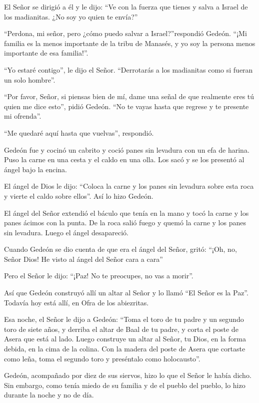  El Señor se dirigió a él y le dijo: ``Ve con la fuerza que
tienes y salva a Israel de los madianitas. ¿No soy yo quien te envía?''

 ``Perdona, mi señor, pero ¿cómo puedo salvar a
Israel?''respondió Gedeón. ``¡Mi familia es la menos importante de la
tribu de Manasés, y yo soy la persona menos importante de esa
familia!''.

 ``Yo estaré contigo'', le dijo el Señor. ``Derrotarás a
los madianitas como si fueran un solo hombre''.

 ``Por favor, Señor, si piensas bien de mí, dame una señal
de que realmente eres tú quien me dice esto'', pidió Gedeón.
 ``No te vayas hasta que regrese y te presente mi
ofrenda''.

``Me quedaré aquí hasta que vuelvas'', respondió.

 Gedeón fue y cocinó un cabrito y coció panes sin levadura
con un efa de harina. Puso la carne en una cesta y el caldo en una olla.
Los sacó y se los presentó al ángel bajo la encina.

 El ángel de Dios le dijo: ``Coloca la carne y los panes
sin levadura sobre esta roca y vierte el caldo sobre ellos''. Así lo
hizo Gedeón.

 El ángel del Señor extendió el báculo que tenía en la mano
y tocó la carne y los panes ácimos con la punta. De la roca salió fuego
y quemó la carne y los panes sin levadura. Luego el ángel desapareció.

 Cuando Gedeón se dio cuenta de que era el ángel del Señor,
gritó: ``¡Oh, no, Señor Dios! He visto al ángel del Señor cara a cara''

 Pero el Señor le dijo: ``¡Paz! No te preocupes, no vas a
morir''.

 Así que Gedeón construyó allí un altar al Señor y lo llamó
``El Señor es la Paz''. Todavía hoy está allí, en Ofra de los
abiezritas.

 Esa noche, el Señor le dijo a Gedeón: ``Toma el toro de tu
padre y un segundo toro de siete años, y derriba el altar de Baal de tu
padre, y corta el poste de Asera que está al lado.  Luego
construye un altar al Señor, tu Dios, en la forma debida, en la cima de
la colina. Con la madera del poste de Asera que cortaste como leña, toma
el segundo toro y preséntalo como holocausto''.

 Gedeón, acompañado por diez de sus siervos, hizo lo que el
Señor le había dicho. Sin embargo, como tenía miedo de su familia y de
el pueblo del pueblo, lo hizo durante la noche y no de día.

